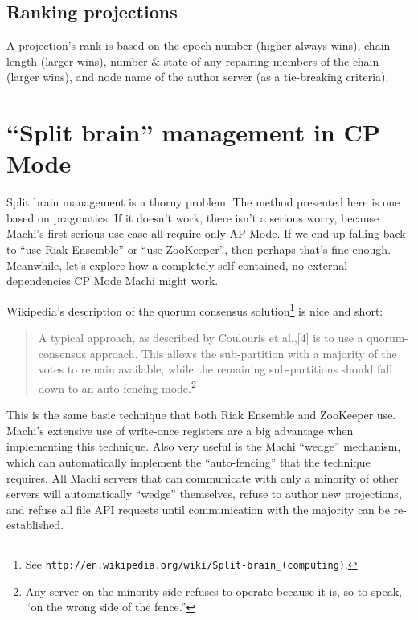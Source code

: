 \documentclass[preprint,10pt]{sigplanconf}
\begin{document}
\subsection{Ranking projections}
\label{sub:ranking-projections}

A projection's rank is based on the epoch number (higher always wins),
chain length (larger wins), number \& state of any repairing members
of the chain (larger wins), and node name of the author server (as a
tie-breaking criteria).

\section{``Split brain'' management in CP Mode}
\label{sec:split-brain-management}

Split brain management is a thorny problem.  The method presented here
is one based on pragmatics.  If it doesn't work, there isn't a serious
worry, because Machi's first serious use case all require only AP Mode.
If we end up falling back to ``use Riak Ensemble'' or ``use ZooKeeper'',
then perhaps that's
fine enough.  Meanwhile, let's explore how a
completely self-contained, no-external-dependencies
CP Mode Machi might work.

Wikipedia's description of the quorum consensus solution\footnote{See
  {\tt http://en.wikipedia.org/wiki/Split-brain\_(computing)}.} is nice
and short:

\begin{quotation}
A typical approach, as described by Coulouris et al.,[4] is to use a
quorum-consensus approach. This allows the sub-partition with a
majority of the votes to remain available, while the remaining
sub-partitions should fall down to an auto-fencing mode.\footnote{Any
  server on the minority side refuses to operate
  because it is, so to speak, ``on the wrong side of the fence.''}
\end{quotation}

This is the same basic technique that
both Riak Ensemble and ZooKeeper use.  Machi's
extensive use of write-once registers are a big advantage when implementing
this technique.  Also very useful is the Machi ``wedge'' mechanism,
which can automatically implement the ``auto-fencing'' that the
technique requires.  All Machi servers that can communicate with only
a minority of other servers will automatically ``wedge'' themselves,
refuse to author new projections, and
refuse all file API requests until communication with the
majority can be re-established.
\end{document}
